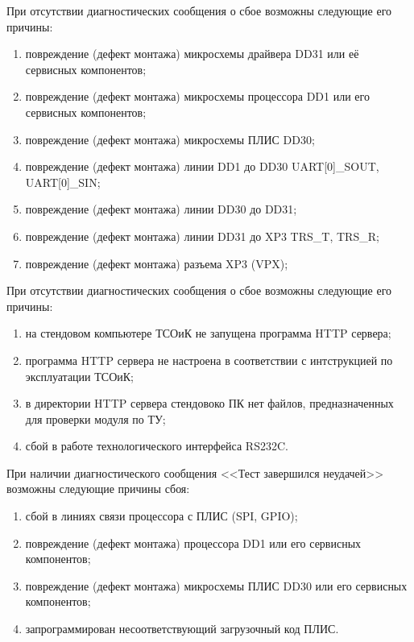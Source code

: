     \subpoint При отсутствии диагностических сообщения о сбое возможны следующие его причины:
      \begin{enumerate}	
	\item повреждение (дефект монтажа) микросхемы драйвера DD31 или её сервисных компонентов;
	\item повреждение (дефект монтажа) микросхемы процессора DD1 или его сервисных компонентов;
	\item повреждение (дефект монтажа) микросхемы ПЛИС DD30;
	\item повреждение (дефект монтажа) линии DD1 до DD30 UART[0]\_SOUT, UART[0]\_SIN;
	\item повреждение (дефект монтажа) линии DD30 до DD31;
	\item повреждение (дефект монтажа) линии DD31 до XP3 TRS\_T, TRS\_R;
	\item повреждение (дефект монтажа) разъема XP3 (VPX);
      \end{enumerate}
      
    \subpoint При отсутствии диагностических сообщения о сбое возможны следующие его причины:
      \begin{enumerate}
	\item на стендовом компьютере ТСОиК не запущена программа HTTP сервера;
	\item программа HTTP сервера не настроена в соответствии с интструкцией по эксплуатации ТСОиК;
	\item в директории HTTP сервера стендовоко ПК нет файлов, предназначенных для проверки модуля по ТУ;
	\item сбой в работе технологического интерфейса RS232C.
      \end{enumerate} 
      
    \subpoint При наличии диагностического сообщения <<Тест завершился неудачей>> возможны следующие причины сбоя:
      \begin{enumerate}
	\item сбой в линиях связи процессора с ПЛИС (SPI, GPIO);
	\item повреждение (дефект монтажа) процессора DD1 или его сервисных компонентов;
	\item повреждение (дефект монтажа) микросхемы ПЛИС DD30 или его сервисных компонентов;
	\item запрограммирован несоответствующий загрузочный код ПЛИС.
      \end{enumerate}
      
